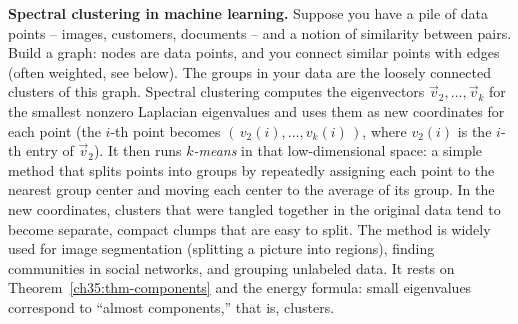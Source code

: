 \begin{applicationbox}
\textbf{Spectral clustering in machine learning.} Suppose you have a pile of data points
-- images, customers, documents -- and a notion of similarity between pairs. Build a graph:
nodes are data points, and you connect similar points with edges (often weighted, see
below). The groups in your data are the loosely connected clusters of this graph.
Spectral clustering computes the eigenvectors $\vec{v}_2,\dots,\vec{v}_k$ for the smallest
nonzero Laplacian eigenvalues and uses them as new coordinates for each point (the $i$-th
point becomes $(\,v_2(i),\dots,v_k(i)\,)$, where $v_2(i)$ is the $i$-th entry of $\vec v_2$).
It then runs \emph{$k$-means} in that low-dimensional space: a simple method that splits
points into groups by repeatedly assigning each point to the nearest group center and moving
each center to the average of its group. In the new coordinates, clusters that were tangled
together in the original data tend to become separate, compact clumps that are easy to
split. The method is widely used for image segmentation (splitting a picture into regions),
finding communities in social networks, and grouping unlabeled data. It rests on
Theorem~\ref{ch35:thm-components} and the energy formula: small eigenvalues correspond to
``almost components,'' that is, clusters.
\end{applicationbox}

